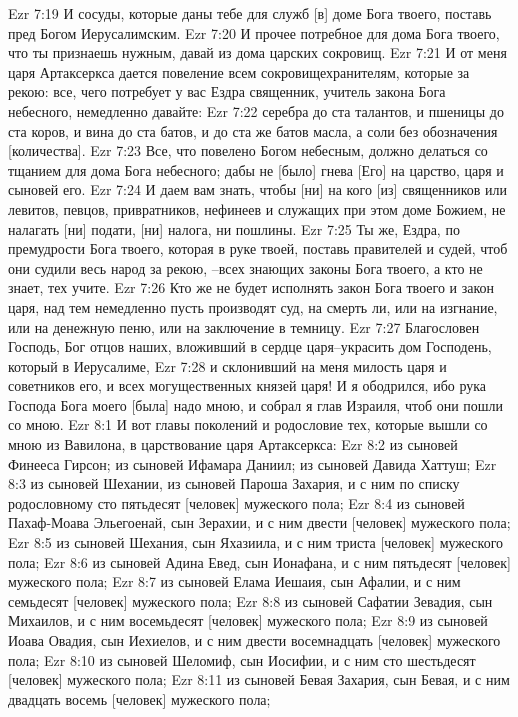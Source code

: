 Ezr 7:19  И сосуды, которые даны тебе для служб [в] доме Бога твоего, поставь пред Богом Иерусалимским.
Ezr 7:20  И прочее потребное для дома Бога твоего, что ты признаешь нужным, давай из дома царских сокровищ.
Ezr 7:21  И от меня царя Артаксеркса дается повеление всем сокровищехранителям, которые за рекою: все, чего потребует у вас Ездра священник, учитель закона Бога небесного, немедленно давайте:
Ezr 7:22  серебра до ста талантов, и пшеницы до ста коров, и вина до ста батов, и до ста же батов масла, а соли без обозначения [количества].
Ezr 7:23  Все, что повелено Богом небесным, должно делаться со тщанием для дома Бога небесного; дабы не [было] гнева [Его] на царство, царя и сыновей его.
Ezr 7:24  И даем вам знать, чтобы [ни] на кого [из] священников или левитов, певцов, привратников, нефинеев и служащих при этом доме Божием, не налагать [ни] подати, [ни] налога, ни пошлины.
Ezr 7:25  Ты же, Ездра, по премудрости Бога твоего, которая в руке твоей, поставь правителей и судей, чтоб они судили весь народ за рекою, --всех знающих законы Бога твоего, а кто не знает, тех учите.
Ezr 7:26  Кто же не будет исполнять закон Бога твоего и закон царя, над тем немедленно пусть производят суд, на смерть ли, или на изгнание, или на денежную пеню, или на заключение в темницу.
Ezr 7:27  Благословен Господь, Бог отцов наших, вложивший в сердце царя--украсить дом Господень, который в Иерусалиме,
Ezr 7:28  и склонивший на меня милость царя и советников его, и всех могущественных князей царя! И я ободрился, ибо рука Господа Бога моего [была] надо мною, и собрал я глав Израиля, чтоб они пошли со мною.
Ezr 8:1  И вот главы поколений и родословие тех, которые вышли со мною из Вавилона, в царствование царя Артаксеркса:
Ezr 8:2  из сыновей Финееса Гирсон; из сыновей Ифамара Даниил; из сыновей Давида Хаттуш;
Ezr 8:3  из сыновей Шехании, из сыновей Пароша Захария, и с ним по списку родословному сто пятьдесят [человек] мужеского пола;
Ezr 8:4  из сыновей Пахаф-Моава Эльегоенай, сын Зерахии, и с ним двести [человек] мужеского пола;
Ezr 8:5  из сыновей Шехания, сын Яхазиила, и с ним триста [человек] мужеского пола;
Ezr 8:6  из сыновей Адина Евед, сын Ионафана, и с ним пятьдесят [человек] мужеского пола;
Ezr 8:7  из сыновей Елама Иешаия, сын Афалии, и с ним семьдесят [человек] мужеского пола;
Ezr 8:8  из сыновей Сафатии Зевадия, сын Михаилов, и с ним восемьдесят [человек] мужеского пола;
Ezr 8:9  из сыновей Иоава Овадия, сын Иехиелов, и с ним двести восемнадцать [человек] мужеского пола;
Ezr 8:10  из сыновей Шеломиф, сын Иосифии, и с ним сто шестьдесят [человек] мужеского пола;
Ezr 8:11  из сыновей Бевая Захария, сын Бевая, и с ним двадцать восемь [человек] мужеского пола;
